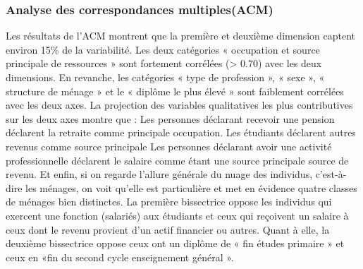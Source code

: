 \documentclass[11pt,a4paper, x11names]{article}\usepackage[]{graphicx}\usepackage[]{color}
\begin{document}
\subsubsection{Analyse des correspondances multiples(ACM)}
Les résultats de l'ACM montrent que la première et deuxième dimension captent environ 15\% de la variabilité. Les deux catégories « occupation et source principale de ressources » sont fortement corrélées (> 0.70) avec les deux dimensions.  En revanche, les catégories « type de profession », « sexe », « structure de ménage » et le « diplôme le plus élevé » sont faiblement corrélées avec les deux axes.
La projection des variables qualitatives les plus contributives sur les deux axes montre que :
Les personnes déclarant recevoir une pension déclarent la retraite comme principale occupation.
Les étudiants déclarent autres revenus comme source principale
Les personnes déclarant avoir une activité professionnelle déclarent le salaire comme étant une source principale source de revenu.
Et enfin, si on regarde l'allure générale du nuage des individus, c'est-à-dire les ménages, on voit qu'elle est particulière et met en évidence quatre classes de ménages bien distinctes. La première bissectrice oppose les individus qui exercent une fonction (salariés) aux étudiants et ceux qui reçoivent un salaire à ceux dont le revenu provient d'un actif financier ou autres. Quant à elle, la deuxième bissectrice oppose ceux ont un diplôme de « fin études primaire » et ceux en «fin du second cycle enseignement général ».
 
\end{document}
